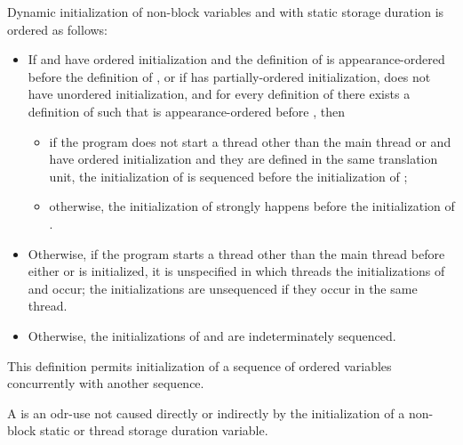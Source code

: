\pnum
Dynamic initialization of non-block variables  and 
with static storage duration is ordered as follows:
\begin{itemize}
\item
If  and  have ordered initialization and
the definition of 
is appearance-ordered before the definition of , or
if  has partially-ordered initialization,
 does not have unordered initialization, and
for every definition  of 
there exists a definition  of 
such that  is appearance-ordered before , then
\begin{itemize}
\item
if the program does not start a thread
other than the main thread
or  and  have ordered initialization and
they are defined in the same translation unit,
the initialization of 
is sequenced before
the initialization of ;
\item
otherwise,
the initialization of 
strongly happens before
the initialization of .
\end{itemize}

\item
Otherwise, if the program starts a thread
other than the main thread
before either  or  is initialized,
it is unspecified in which threads
the initializations of  and  occur;
the initializations are unsequenced if they occur in the same thread.

\item
Otherwise, the initializations of  and  are indeterminately sequenced.
\end{itemize}
\begin{note}
This definition permits initialization of a sequence of
ordered variables concurrently with another sequence.
\end{note}

\pnum
{}%
A 
is an odr-use not caused directly or indirectly by
the initialization of a non-block static or thread storage duration variable.

